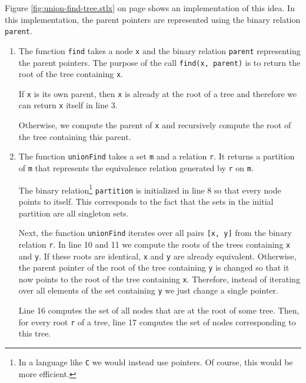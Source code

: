 Figure \ref{fig:union-find-tree.stlx} on page \pageref{fig:union-find-tree.stlx} shows an
implementation of this idea.  In this implementation, the parent pointers are represented using the
binary relation \texttt{parent}.  
\begin{enumerate}
\item The function \texttt{find} takes a node \texttt{x} and the binary relation \texttt{parent} 
      representing the parent pointers.  The purpose of the call \texttt{find(x, parent)} is to
      return the root of the tree containing \texttt{x}.

      If \texttt{x} is its own parent, then \texttt{x} is already at the root of a tree and therefore 
      we can return \texttt{x} itself in line 3.

      Otherwise, we compute the parent of \texttt{x} and recursively compute the root of the tree
      containing this parent.  
\item The function \texttt{unionFind} takes a set \texttt{m} and a relation \texttt{r}.  It returns
      a partition of \texttt{m} that represents the equivalence relation generated by \texttt{r} on
      \texttt{m}.

      The binary relation\footnote{
        In a language like \texttt{C} we would instead use pointers.  Of course, this would be more efficient.
      } \texttt{partition} is initialized in line 8 so that every node
      points to itself.   This corresponds to the fact that the sets in the initial partition are all
      singleton sets.  

      Next, the function \texttt{unionFind} iterates over all pairs \texttt{[x, y]} from the binary
      relation \texttt{r}.  In line 10 and 11 we compute the roots of the trees containing \texttt{x} and
      \texttt{y}.  If these roots are identical, \texttt{x} and \texttt{y} are already equivalent.
      Otherwise, the parent pointer of the root of the tree containing \texttt{y} is changed so that it
      now points to the root of the tree containing \texttt{x}.  Therefore, instead of iterating over all
      elements of the set containing \texttt{y} we just change a single pointer.

      Line 16 computes the set of all nodes that are at the root of some tree.  Then, for every root
      \texttt{r} of a tree, line 17 computes the set of nodes corresponding to this tree.
\end{enumerate}

